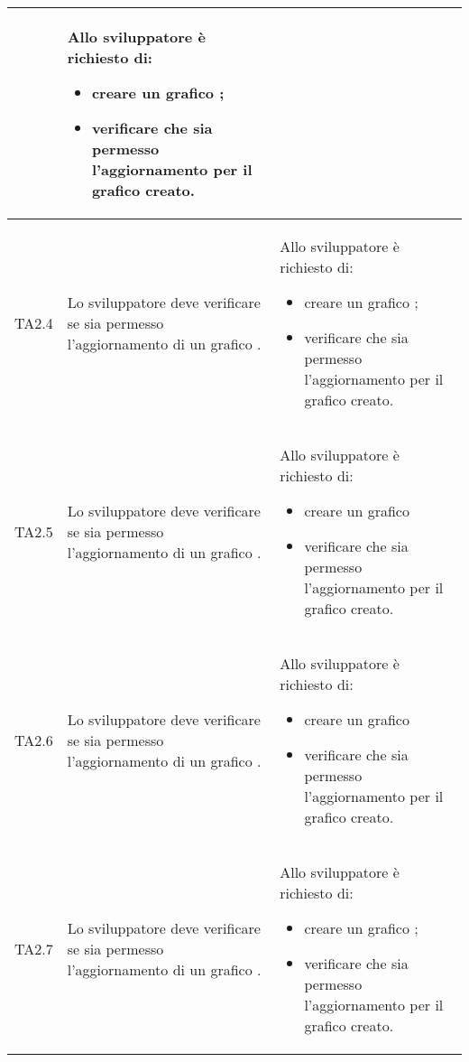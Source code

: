\begin{longtabu}{| X[0.5] | X | X |}
		& Allo sviluppatore è richiesto di:
		\begin{itemize}
			\item creare un grafico ;
			\item verificare che sia permesso l'aggiornamento  per il grafico creato.
		\end{itemize}
\\ \hline

	TA2.4 & Lo sviluppatore deve verificare se sia permesso l'aggiornamento  di un grafico .
		
		& Allo sviluppatore è richiesto di:
		\begin{itemize}
			\item creare un grafico ;
			\item verificare che sia permesso l'aggiornamento  per il grafico creato.
		\end{itemize}
\\ \hline

	TA2.5 & Lo sviluppatore deve verificare se sia permesso l'aggiornamento  di un grafico .
		
		& Allo sviluppatore è richiesto di:
		\begin{itemize}
			\item creare un grafico 
			\item verificare che sia permesso l'aggiornamento  per il grafico creato.
		\end{itemize}
\\ \hline

	TA2.6 & Lo sviluppatore deve verificare se sia permesso l'aggiornamento  di un grafico .
		
		& Allo sviluppatore è richiesto di:
		\begin{itemize}
			\item creare un grafico 
			\item verificare che sia permesso l'aggiornamento  per il grafico creato.
		\end{itemize}
\\ \hline

	TA2.7 & Lo sviluppatore deve verificare se sia permesso l'aggiornamento  di un grafico .
		
		& Allo sviluppatore è richiesto di:
		\begin{itemize}
			\item creare un grafico ;
			\item verificare che sia permesso l'aggiornamento  per il grafico creato.
		\end{itemize}
\\ \hline


\end{longtabu}
